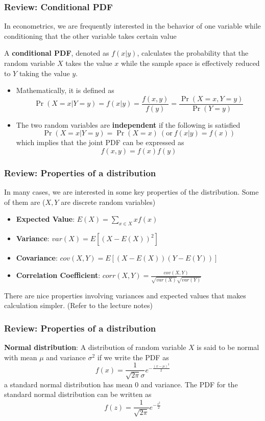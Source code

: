 \documentclass[compress]{beamer}
\newenvironment{wideitemize}{\itemize\addtolength{\itemsep}{10pt}}{\enditemize}
\begin{document}
\begin{frame}
\frametitle{Review: Conditional PDF}
\begin{wideitemize}
\item In econometrics, we are frequently interested in the behavior of one variable while conditioning that the other variable takes certain value
\item  A \textbf{conditional PDF}, denoted as $f(x|y)$,  calculates the probability that the random variable $X$ takes the value $x$ while the sample space is effectively reduced to $Y$ taking the value $y$.
\begin{itemize}
\item Mathematically, it is defined as
\[
\Pr(X=x|Y=y)=f(x|y)=\frac{f(x,y)}{f(y)}=\frac{\Pr(X=x, Y=y)}{\Pr(Y=y)}
\] 
\item The two random variables are \textbf{independent} if the following is satisfied
\[
\Pr(X=x|Y=y)=\Pr(X=x)\ (\text{or}\ f(x|y)=f(x))
\]
which implies that the joint PDF can be expressed as
\[
f(x,y)=f(x)f(y)
\]
\end{itemize}
\end{wideitemize}
\end{frame}


\begin{frame}
\frametitle{Review: Properties of a distribution}
\begin{wideitemize}
\item In many cases, we are interested in some key properties of the distribution. Some of them are ($X,Y$ are discrete random variables) \\
\begin{itemize}
\item \textbf{Expected Value}: $E(X)=\sum_{x\in X} xf(x)$
\item \textbf{Variance}: $var(X)=E[(X-E(X))^2]$
\item \textbf{Covariance}: $cov(X,Y)=E[(X-E(X))(Y-E(Y))]$
\item \textbf{Correlation Coefficient}: $corr(X,Y)=\frac{cov(X,Y)}{\sqrt{var(X)}\sqrt{var(Y)}}$
\end{itemize}
\item There are nice properties involving variances and expected values that makes calculation simpler. (Refer to the lecture notes)
\end{wideitemize}
\end{frame}


\begin{frame}
\frametitle{Review: Properties of a distribution}
\begin{wideitemize}
\item \textbf{Normal distribution}: A distribution of random variable $X$ is said to be normal with mean $\mu$ and variance $\sigma^2$ if we write the PDF as
\[
f(x) = \frac{1}{\sqrt{2\pi}\sigma}e^{-\frac{(x-\mu)^2}{2}}
\]
a standard normal distribution has mean 0 and variance. The PDF for the standard normal distribution can be written as 
\[
f(z) = \frac{1}{\sqrt{2\pi}}e^{-\frac{z^2}{2}}
\]\end{wideitemize}
\end{frame}
\end{document}
